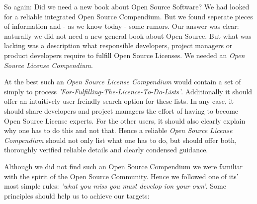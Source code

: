 %
%
%
%
%



So again: Did we need a new book about Open Source Software? We had looked for a
reliable integrated Open Source Compendium. But we found seperate pieces of
information and - as we know today - some rumors. Our answer was clear:
naturally we did not need a new general book about Open Source. But what was
lacking was a description what responsible developers, project managers or
product developers require to fulfill Open Source Licenses. We needed an
\textit{Open Source License Compendium}.

At the best such an \textit{Open Source License Compendium} would contain a set
of simply to process \textit{'For-Fulfilling-The-Licence-To-Do-Lists'}.
Additionally it should offer an intuitively user-freindly search option for
these lists. In any case, it should share developers and project managers the
effort of having to become Open Source License experts. For the other users, it
should also clearly explain why one has to do this and not that. Hence a
reliable \textit{Open Source License Compendium} should not only list what one
has to do, but should offer both, thoroughly verified reliable details and
clearly condensed guidance.

Although we did not find such an Open Source Compendium we were familiar with
the spirit of the Open Source Community. Hence we followed one of its' most
simple rules: \emph{'what you miss you must develop ion your own'}. Some
principles should help us to achieve our targets:


